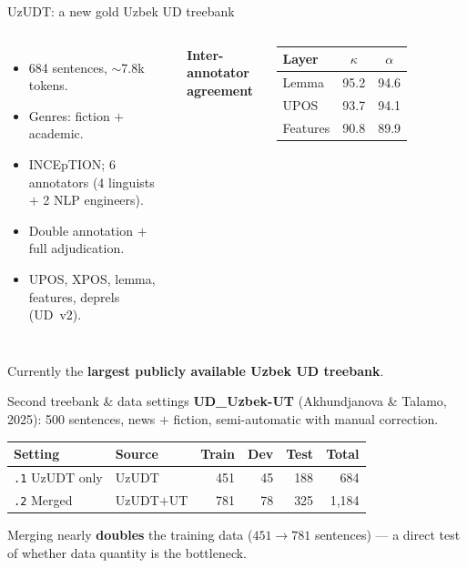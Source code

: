 \documentclass{beamer}
\begin{document}
\begin{frame}{UzUDT: a new gold Uzbek UD treebank}
\begin{columns}[T]
\footnotesize
\begin{itemize}\setlength\itemsep{3pt}
  \item 684 sentences, $\sim$7.8k tokens.
  \item Genres: fiction $+$ academic.
  \item INCEpTION; 6 annotators (4 linguists $+$ 2 NLP engineers).
  \item Double annotation $+$ full adjudication.
  \item UPOS, XPOS, lemma, features, deprels (UD~v2).
\end{itemize}
\centering\scriptsize\textbf{Inter-annotator agreement}\\[3pt]
\begin{tabular}{lcc}
\toprule
Layer & $\kappa$ & $\alpha$ \\
\midrule
Lemma    & 95.2 & 94.6 \\
UPOS     & 93.7 & 94.1 \\
Features & 90.8 & 89.9 \\
\bottomrule
\end{tabular}
\end{columns}
\vspace{0.3cm}
\centering\footnotesize
Currently the \textbf{largest publicly available Uzbek UD treebank}.
\end{frame}

\begin{frame}{Second treebank \& data settings}
\footnotesize
\textbf{UD\_Uzbek-UT} (Akhundjanova \& Talamo, 2025): 500 sentences,
news $+$ fiction, semi-automatic with manual correction.
\vspace{0.35cm}
\centering
\begin{tabular}{llrrrr}
\toprule
Setting & Source & Train & Dev & Test & Total \\
\midrule
\texttt{.1} UzUDT only & UzUDT      & 451 & 45 & 188 & 684 \\
\texttt{.2} Merged     & UzUDT$+$UT & 781 & 78 & 325 & 1{,}184 \\
\bottomrule
\end{tabular}
\vspace{0.35cm}
\flushleft
Merging nearly \textbf{doubles} the training data
($451 \rightarrow 781$ sentences) --- a direct test of whether data
quantity is the bottleneck.
\end{frame}
\end{document}
